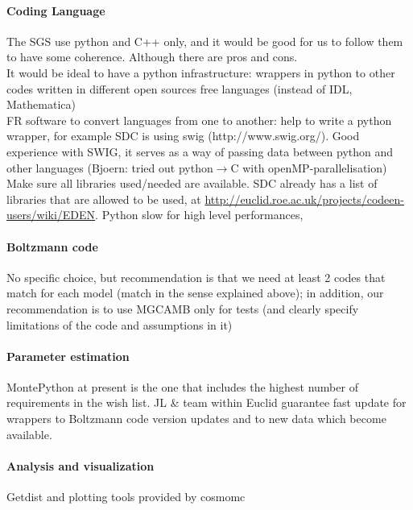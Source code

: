 \paragraph{Coding Language}
The SGS use python and C++ only, and it would be good for us to follow them to have some coherence. Although there are pros and cons.\\
It would be ideal to have a python infrastructure: wrappers in python to other codes written in different open sources free languages (instead of IDL, Mathematica)\\
FR software to convert languages from one to another: help to write a python wrapper, for example SDC is using swig (http://www.swig.org/).
Good experience with SWIG, it serves as a way of passing data between python and other languages (Bjoern: tried out python$\rightarrow$C with openMP-parallelisation)\\
Make sure all libraries used/needed are available. 
SDC already has a list of libraries that are allowed to be used, at \url{http://euclid.roe.ac.uk/projects/codeen-users/wiki/EDEN}.
Python slow for high level performances, 


\paragraph{Boltzmann code}

No specific choice, but recommendation is that we need at least 2 codes that match for each model (match in the sense explained above); 
in addition, our recommendation is to use MGCAMB only for tests (and clearly specify limitations of the code and assumptions in it)


\paragraph{Parameter estimation}
MontePython at present is the one that includes the highest number of requirements in the wish list. JL \& team within Euclid guarantee fast 
update for wrappers to Boltzmann code version updates and to new data which become available. 

\paragraph{Analysis and visualization}
Getdist and plotting tools provided by cosmomc

